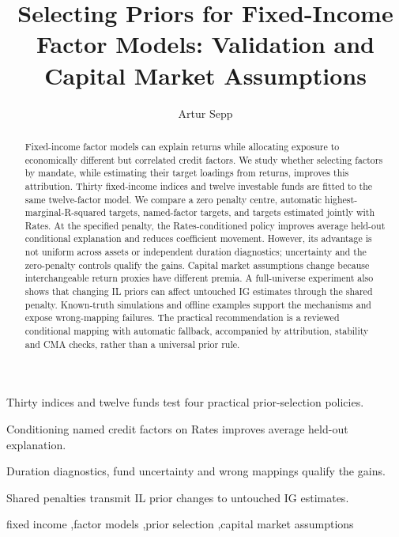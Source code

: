 \documentclass[a4paper,review]{cas-sc}
\begin{document}
\let\WriteBookmarks\relax
\def\floatpagepagefraction{1}
\def\textpagefraction{.001}
\title[mode=title]{Selecting Priors for Fixed-Income Factor Models: Validation and Capital Market Assumptions}
\tnotemark[1]
\author{Artur Sepp}
\begin{abstract}
Fixed-income factor models can explain returns while allocating exposure to economically different but correlated credit factors. We study whether selecting factors by mandate, while estimating their target loadings from returns, improves this attribution. Thirty fixed-income indices and twelve investable funds are fitted to the same twelve-factor model. We compare a zero penalty centre, automatic highest-marginal-R-squared targets, named-factor targets, and targets estimated jointly with Rates. At the specified penalty, the Rates-conditioned policy improves average held-out conditional explanation and reduces coefficient movement. However, its advantage is not uniform across assets or independent duration diagnostics; uncertainty and the zero-penalty controls qualify the gains. Capital market assumptions change because interchangeable return proxies have different premia. A full-universe experiment also shows that changing IL priors can affect untouched IG estimates through the shared penalty. Known-truth simulations and offline examples support the mechanisms and expose wrong-mapping failures. The practical recommendation is a reviewed conditional mapping with automatic fallback, accompanied by attribution, stability and CMA checks, rather than a universal prior rule.
\end{abstract}
\begin{highlights}
\item Thirty indices and twelve funds test four practical prior-selection policies.
\item Conditioning named credit factors on Rates improves average held-out explanation.
\item Duration diagnostics, fund uncertainty and wrong mappings qualify the gains.
\item Shared penalties transmit IL prior changes to untouched IG estimates.
\end{highlights}
\begin{keywords}
fixed income \sep factor models \sep prior selection \sep capital market assumptions
\end{keywords}
\maketitle
\end{document}
